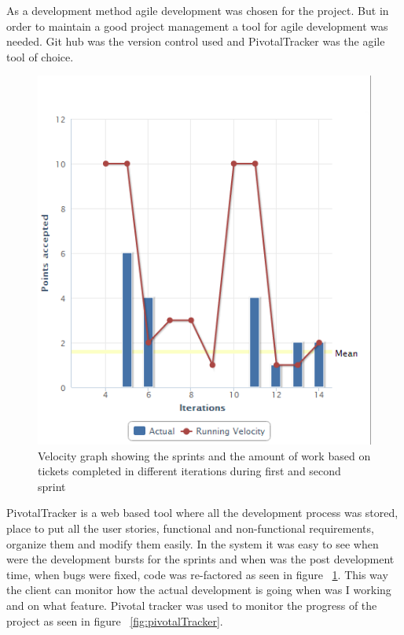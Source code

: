 As a development method agile development was chosen for the project. But in order to maintain a good project management a tool for
agile development was needed. Git hub \cite{github} was the version control used and PivotalTracker \cite{pivotal}
was the agile tool of choice.

\begin{figure}[htp]
\centering
\includegraphics[scale=0.6]{Figures/pivotalGraph.png}
\caption{Velocity graph showing the sprints and the amount of work based on tickets completed in different iterations during first and second sprint}
\label{fig:pivotalGraph}
\end{figure}

PivotalTracker is a web based tool where all the development process was stored, place to put all the user stories, functional
and non-functional requirements, organize them and modify them easily. In the system it was easy to see when were the development bursts for the sprints and when was the post development time, when bugs were fixed, code was re-factored as seen in figure ~\ref{fig:pivotalGraph}.
This way the client can monitor how the actual development is going when was I working and on what feature. Pivotal tracker was used to monitor the progress
of the project as seen in figure ~\ref{fig:pivotalTracker}.


